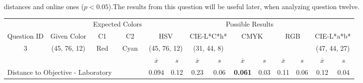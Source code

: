 distances and online ones ($p < 0.05$).The results from this question will be useful later, when analyzing question twelve.
%
\begin{table}[H]
  \resizebox{\textwidth}{!} {
  \begin{tabular}{lccccccccccccc}
    \hline
    \multicolumn{1}{c}{}                              &                                      & \multicolumn{2}{c}{Expected Colors}                   & \multicolumn{10}{c}{Possible Results}                                                                                                                                                                                                                                                                                        \\ \cline{3-14}
    \multicolumn{1}{c}{\multirow{-2}{*}{Question ID}} & \multirow{-2}{*}{Given Color}        & C1                       & C2                         & \multicolumn{2}{c}{HSV}                                        & \multicolumn{2}{c}{CIE-L*C*h*}                                 & \multicolumn{2}{c}{CMYK}                                       & \multicolumn{2}{c}{RGB}                                        & \multicolumn{2}{c}{CIE-L*a*b*}                                 \\ \hline
    \multicolumn{1}{c}{3}                             & \cellcolor[HTML]{80FF00}(45, 76, 12) & \multicolumn{1}{c|}{Red} & \multicolumn{1}{c|}{Cyan}  & \multicolumn{2}{c|}{\cellcolor[HTML]{80FF00}(45, 76, 12)}      & \multicolumn{2}{c|}{\cellcolor[HTML]{91C01D}(31, 44, 8)}       & \multicolumn{2}{c|}{\cellcolor[HTML]{808080}{\color[HTML]{FFFFFF}(21, 22, 24)}}       & \multicolumn{2}{c|}{\cellcolor[HTML]{808080}{\color[HTML]{FFFFFF}(21, 22, 24)}}       & \multicolumn{2}{c|}{\cellcolor[HTML]{DDA581}(47, 44, 27)}       \\ \hline
                                                      & \multicolumn{1}{l}{}                 & \multicolumn{1}{l}{}     & \multicolumn{1}{l}{}       & \multicolumn{1}{c}{$\overline{x}$} & \multicolumn{1}{c}{$s$} & \multicolumn{1}{c}{$\overline{x}$} & \multicolumn{1}{c}{$s$} & \multicolumn{1}{c}{$\overline{x}$} & \multicolumn{1}{c}{$s$} & \multicolumn{1}{c}{$\overline{x}$} & \multicolumn{1}{c}{$s$} & \multicolumn{1}{c}{$\overline{x}$} & \multicolumn{1}{c}{$s$} \\ \hline
    \multicolumn{4}{l}{Distance to Objective - Laboratory}                                                                                           & \multicolumn{1}{|c}{0.094}       & \multicolumn{1}{c|}{0.12}    & \multicolumn{1}{|c}{0.23}       & \multicolumn{1}{c|}{0.06}    & \multicolumn{1}{|c}{\textbf{0.061}}       & \multicolumn{1}{c|}{0.03}    & \multicolumn{1}{|c}{0.11}       & \multicolumn{1}{c|}{0.06}    & \multicolumn{1}{|c}{0.12}       & \multicolumn{1}{c|}{0.04}    \\

\end{tabular}}
\end{table}
